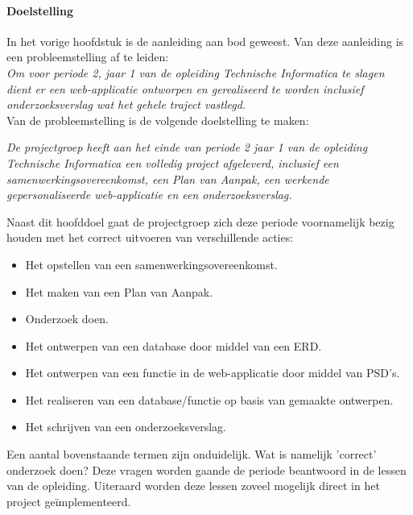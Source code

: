 \documentclass[11pt]{article}
\begin{document}
\paragraph{Doelstelling}
\begin{flushleft}
	In het vorige hoofdstuk is de aanleiding aan bod geweest. Van deze aanleiding is een probleemstelling af te leiden:\\
	\vspace{2mm}
	\textit{Om voor periode 2, jaar 1 van de opleiding Technische Informatica te slagen dient er een web-applicatie ontworpen en gerealiseerd te worden inclusief onderzoeksverslag wat
	het gehele traject vastlegd. }\vspace{2mm} \\

    Van de probleemstelling is de volgende doelstelling te maken:
	
	\vspace{2mm}
	\textit{De projectgroep heeft aan het einde van periode 2 jaar 1 van de opleiding Technische Informatica een volledig project afgeleverd, inclusief een samenwerkingsovereenkomst, een Plan van Aanpak, een werkende gepersonaliseerde web-applicatie en een onderzoeksverslag.}\vspace{2mm}
	
	
	Naast dit hoofddoel gaat de projectgroep zich deze periode voornamelijk bezig houden met het correct uitvoeren van verschillende acties:
	\begin{itemize}
		\item Het opstellen van een samenwerkingsovereenkomst.
		\item Het maken van een Plan van Aanpak.
		\item Onderzoek doen.
		\item Het ontwerpen van een database door middel van een ERD.
		\item Het ontwerpen van een functie in de web-applicatie door middel van PSD's.
		\item Het realiseren van een database/functie op basis van gemaakte ontwerpen.
		\item Het schrijven van een onderzoeksverslag.
	\end{itemize}
\end{flushleft}

\begin{flushleft}
	Een aantal bovenstaande termen zijn onduidelijk. Wat is namelijk 'correct' onderzoek doen? Deze vragen worden gaande de periode beantwoord in de lessen van de opleiding.
	Uiteraard worden deze lessen zoveel mogelijk direct in het project geïmplementeerd.
\end{flushleft}
\end{document}
